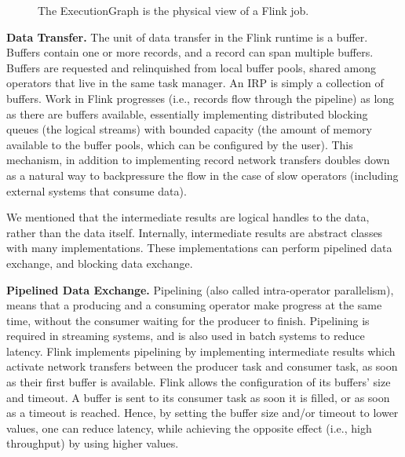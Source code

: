 \documentclass[11pt]{article}
\begin{document}
\begin{figure}[ht]
\label{fig:ExecutionGraph}
\caption{The ExecutionGraph is the physical view of a Flink job.}
\end{figure}

\textbf{Data Transfer.} The unit of data transfer in the Flink runtime is a buffer. Buffers contain one or more records, and a record can span multiple buffers. Buffers are requested and relinquished from local buffer pools, shared among operators that live in the same task manager. An IRP is simply a collection of buffers. Work in Flink progresses (i.e., records flow through the pipeline) as long as there are buffers available, essentially implementing distributed blocking queues (the logical streams) with bounded capacity (the amount of memory available to the buffer pools, which can be configured by the user). This mechanism, in addition to implementing record network transfers doubles down as a natural way to backpressure the flow in the case of slow operators (including external systems that consume data). 

We mentioned that the intermediate results are logical handles to the data, rather than the data itself. Internally, intermediate results are abstract classes with many implementations. These implementations can perform pipelined data exchange, and blocking data exchange.

\textbf{Pipelined Data Exchange.} Pipelining (also called intra-operator parallelism), means that a producing and a consuming operator make progress at the same time, without the consumer waiting for the producer to finish. Pipelining is required in streaming systems, and is also used in batch systems to reduce latency. Flink implements pipelining by implementing intermediate results which activate network transfers between the producer task and consumer task,  as soon as their first buffer is available. Flink allows the configuration of its buffers' size and timeout. A buffer is sent to its consumer task as soon it is filled,  or as soon as a timeout is reached. Hence, by setting the buffer size and/or timeout to lower values, one can reduce latency, while achieving the opposite effect (i.e., high throughput) by using higher values.
\end{document}
